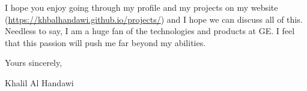 \documentclass[12pt]{article} %
\begin{document}
\medskip %

I hope you enjoy going through my profile and my projects on my website (\href{https://khbalhandawi.github.io/projects/}{https://khbalhandawi.github.io/projects/}) and I hope we can discuss all of this. Needless to say, I am a huge fan of the technologies and products at GE. I feel that this passion will push me far beyond my abilities.





\medskip %

Yours sincerely,

\medskip %

Khalil Al Handawi

\medskip %

\end{document}
